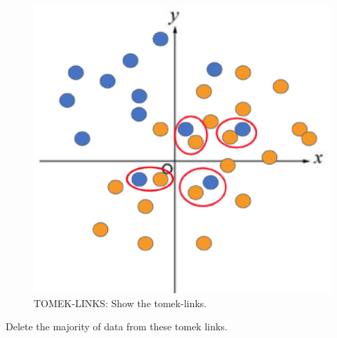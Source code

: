 \begin{center}
    \begin{figure}[ht]
        \caption{TOMEK-LINKS: Show the tomek-links.}
        \label{tab:team-rating-features}
        \begin{center}
            \includegraphics[scale=0.6]{image/tomek2.eps}
        \end{center}
    \end{figure}
\end{center}

\clearpage

Delete the majority of data from these tomek links.

